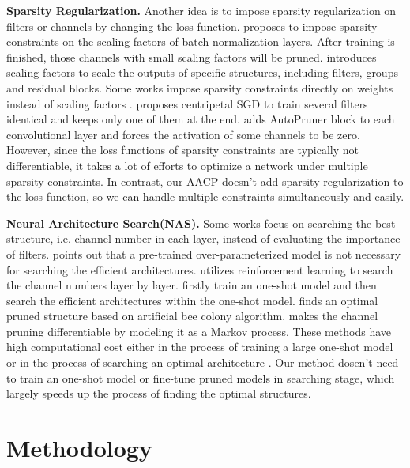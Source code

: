 \documentclass[final]{cvpr}
\begin{document}
\textbf{Sparsity Regularization.} Another idea is to impose sparsity regularization on filters or channels by changing the loss function. 
\cite{liu2017learning} proposes to impose sparsity constraints on 
the scaling factors of batch normalization layers. After training is finished, those channels with small scaling factors will 
be pruned. \cite{huang2018data} introduces scaling factors to scale the outputs of specific structures, including filters, groups and residual 
blocks. Some works impose sparsity constraints directly on weights instead of scaling factors \cite{wen2016learning,alvarez2016learning}. 
\cite{ding2019centripetal} proposes 
centripetal SGD to train several filters identical and keeps only one of them at the end. \cite{luo2020autopruner} adds AutoPruner block to 
each convolutional layer and forces the activation of some channels to be zero. However, since the loss functions of sparsity constraints are 
typically not differentiable, it takes a lot of efforts to optimize a network under multiple sparsity constraints.
In contrast, our AACP doesn't add sparsity regularization to the loss function, so we can handle multiple constraints simultaneously and easily.

\textbf{Neural Architecture Search(NAS).} Some works focus on searching the best structure, i.e. channel number in each layer, instead 
of evaluating the importance of filters. \cite{wang2019pruning} points out that a 
pre-trained over-parameterized model is not necessary for searching the efficient architectures. \cite{he2018amc} utilizes reinforcement 
learning to search the channel numbers layer by layer. \cite{yu2019autoslim,liu2019metapruning} firstly train an one-shot model and then 
search the efficient architectures within the one-shot model. \cite{lin2020channel} finds an optimal pruned structure based on artificial bee 
colony algorithm. \cite{guo2020dmcp} makes the channel pruning differentiable by modeling it as a Markov process. These methods have high
computational cost either in the process of training a large one-shot model \cite{yu2019autoslim,liu2019metapruning,he2018amc} 
or in the process of searching an optimal architecture \cite{lin2020channel}. Our method dosen't need to train an one-shot model or 
fine-tune pruned models in searching stage, which largely speeds up the process of finding the optimal structures.

\section{Methodology}
\end{document}
